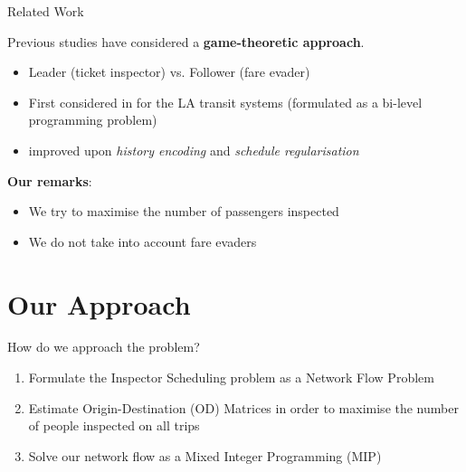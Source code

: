 \documentclass[handout]{beamer}
\begin{document}
\begin{frame}{Related Work}

Previous studies have considered a \textbf{game-theoretic approach}.

\begin{itemize}
    \item Leader (ticket inspector) vs. Follower (fare evader)
    \item First considered in 
    \cite{yin_jiang_tambe_kiekintveld_leyton-brown_sandholm_sullivan_2012} for the 
    LA transit systems (formulated as a bi-level programming problem)
    \item \cite{jiang_yin_johnson_tambe_kiekintveld_leyton-brown_sandholm_2012} improved \cite{yin_jiang_tambe_kiekintveld_leyton-brown_sandholm_sullivan_2012} 
    upon \textit{history encoding} and 
        \textit{schedule regularisation} 
  
\end{itemize}

\textbf{Our remarks}: 
\begin{itemize}
    \item We try to maximise the number of passengers inspected
    \item We do not take into account fare evaders
\end{itemize}
\end{frame}

\section{Our Approach}

\begin{frame}{How do we approach the problem?}
\begin{enumerate}
    \item Formulate the  Inspector Scheduling problem as a Network Flow Problem
    \item Estimate Origin-Destination (OD) Matrices 
    in order to maximise the number of people inspected on all trips
    \item Solve our network flow as a Mixed Integer Programming (MIP)
\end{enumerate}
\end{frame}
\end{document}
